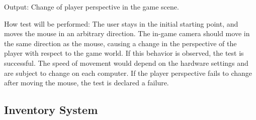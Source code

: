 \documentclass[12pt, titlepage]{article}
\begin{document}
\begin{enumerate}
Output: Change of player perspective in the game scene.
					
How test will be performed: 
The user stays in the initial starting point, and moves the mouse in an arbitrary direction. The in-game camera should move in the same direction as the mouse, causing a change in the perspective of the player with respect to the game world. If this behavior is observed, the test is successful.
\newline
The speed of movement would depend on the hardware settings and are subject to change on each computer. If the player perspective fails to change after moving the mouse, the test is declared a failure. 

\end{enumerate}

\subsection{Inventory System}
\end{document}
